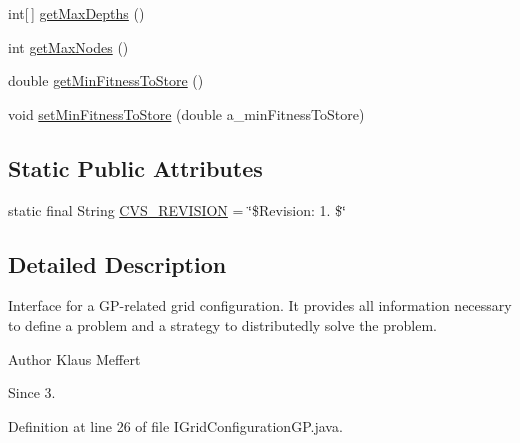 \begin{DoxyCompactItemize}
\item 
int\mbox{[}$\,$\mbox{]} \hyperlink{interfaceorg_1_1jgap_1_1distr_1_1grid_1_1gp_1_1_i_grid_configuration_g_p_a48d4068c2cec49c33f155b195d202028}{get\-Max\-Depths} ()
\item 
int \hyperlink{interfaceorg_1_1jgap_1_1distr_1_1grid_1_1gp_1_1_i_grid_configuration_g_p_a9012e93f5505be3b11dbf2ac50f47678}{get\-Max\-Nodes} ()
\item 
double \hyperlink{interfaceorg_1_1jgap_1_1distr_1_1grid_1_1gp_1_1_i_grid_configuration_g_p_accda4a94fbfdf47949329e51995d0e3d}{get\-Min\-Fitness\-To\-Store} ()
\item 
void \hyperlink{interfaceorg_1_1jgap_1_1distr_1_1grid_1_1gp_1_1_i_grid_configuration_g_p_ae20cea7a88be9388b2b6f54651fb9b31}{set\-Min\-Fitness\-To\-Store} (double a\-\_\-min\-Fitness\-To\-Store)
\end{DoxyCompactItemize}
\subsection*{Static Public Attributes}
\begin{DoxyCompactItemize}
\item 
static final String \hyperlink{interfaceorg_1_1jgap_1_1distr_1_1grid_1_1gp_1_1_i_grid_configuration_g_p_af5be93d435c69963a95f2044ffced3c7}{C\-V\-S\-\_\-\-R\-E\-V\-I\-S\-I\-O\-N} = \char`\"{}\$Revision\-: 1. \$\char`\"{}
\end{DoxyCompactItemize}


\subsection{Detailed Description}
Interface for a G\-P-\/related grid configuration. It provides all information necessary to define a problem and a strategy to distributedly solve the problem.

\begin{DoxyAuthor}{Author}
Klaus Meffert 
\end{DoxyAuthor}
\begin{DoxySince}{Since}
3. 
\end{DoxySince}


Definition at line 26 of file I\-Grid\-Configuration\-G\-P.\-java.



